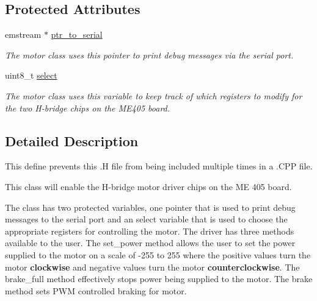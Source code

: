 \subsection*{Protected Attributes}
\begin{DoxyCompactItemize}
\item 
\hypertarget{classmotor__drv_a9cd3052255589d1849217279b4b6e337}{emstream $\ast$ \hyperlink{classmotor__drv_a9cd3052255589d1849217279b4b6e337}{ptr\-\_\-to\-\_\-serial}}\label{classmotor__drv_a9cd3052255589d1849217279b4b6e337}

\begin{DoxyCompactList}\small\item\em The motor class uses this pointer to print debug messages via the serial port. \end{DoxyCompactList}\item 
\hypertarget{classmotor__drv_aca3c3dd889fd865607e312faf0e76c65}{uint8\-\_\-t \hyperlink{classmotor__drv_aca3c3dd889fd865607e312faf0e76c65}{select}}\label{classmotor__drv_aca3c3dd889fd865607e312faf0e76c65}

\begin{DoxyCompactList}\small\item\em The motor class uses this variable to keep track of which registers to modify for the two H-\/bridge chips on the M\-E405 board. \end{DoxyCompactList}\end{DoxyCompactItemize}


\subsection{Detailed Description}
This define prevents this .H file from being included multiple times in a .C\-P\-P file. 

This class will enable the H-\/bridge motor driver chips on the M\-E 405 board.

The class has two protected variables, one pointer that is used to print debug messages to the serial port and an select variable that is used to choose the appropriate registers for controlling the motor. The driver has three methods available to the user. The set\-\_\-power method allows the user to set the power supplied to the motor on a scale of -\/255 to 255 where the positive values turn the motor {\bfseries clockwise} and negative values turn the motor {\bfseries counterclockwise}. The brake\-\_\-full method effectively stops power being supplied to the motor. The brake method sets P\-W\-M controlled braking for motor. 

